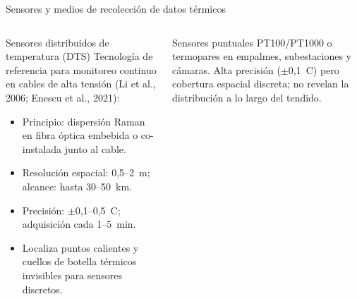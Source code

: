\documentclass[aspectratio=169]{beamer}
\newcommand{\refcite}[1]{{\footnotesize\color{gray!70!black} #1}}
\begin{document}
\begin{frame}{Sensores y medios de recolección de datos térmicos}
\begin{columns}[T]
\begin{block}{Sensores distribuidos de temperatura (DTS)}
\scriptsize\justifying
Tecnología de referencia para monitoreo continuo en cables de alta
tensión \refcite{(Li et al., 2006; Enescu et al., 2021)}:
\begin{itemize}[leftmargin=*,itemsep=1pt]
    \item Principio: dispersión Raman en fibra óptica embebida o
          co-instalada junto al cable.
    \item Resolución espacial: 0{,}5--2~m; alcance: hasta 30--50~km.
    \item Precisión: $\pm$0{,}1--0{,}5~\textdegree{}C; adquisición cada
          1--5~min.
    \item Localiza puntos calientes y cuellos de botella térmicos
          invisibles para sensores discretos.
\end{itemize}
\end{block}
\vspace{0.2em}
\begin{block}{Sensores puntuales}
\scriptsize
PT100/PT1000 o termopares en empalmes, subestaciones y cámaras.
Alta precisión ($\pm$0{,}1~\textdegree{}C) pero cobertura espacial
discreta; no revelan la distribución a lo largo del tendido.
\end{block}


\end{columns}
\end{frame}
\end{document}
